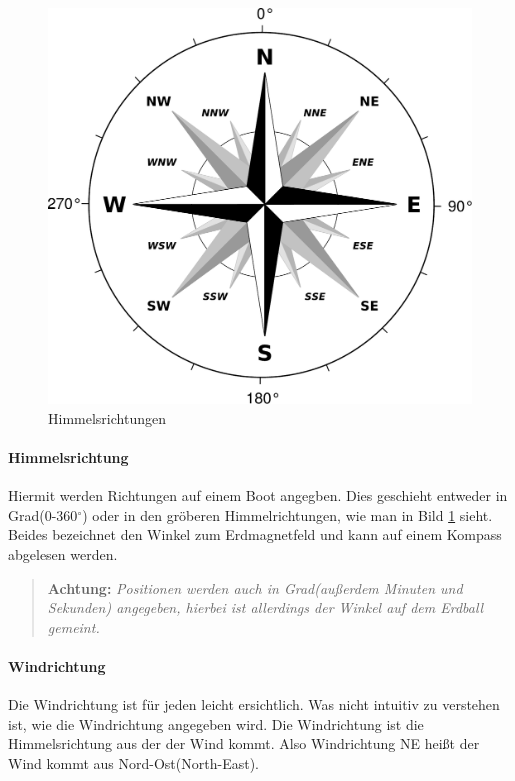 \documentclass[12pt]{article}
\begin{document}
\begin{figure}[H]
\begin{center}
\includegraphics[scale=0.4]{bilder/windrose.pdf}
\caption{Himmelsrichtungen}
\label{himmelsrichtungen}
\end{center}
\end{figure}

\paragraph{Himmelsrichtung}
Hiermit werden Richtungen auf einem Boot angegben. Dies geschieht entweder in Grad(0-360$^\circ$) oder in den gröberen Himmelrichtungen, wie man in Bild \ref{himmelsrichtungen} sieht. Beides bezeichnet den Winkel zum Erdmagnetfeld und kann auf einem Kompass abgelesen werden.

\begin{quote}
\textbf{Achtung:} \textit{Positionen werden auch in Grad(außerdem Minuten und Sekunden) angegeben, hierbei ist allerdings der Winkel auf dem Erdball gemeint.}
\end{quote}

\paragraph{Windrichtung}
Die Windrichtung ist für jeden leicht ersichtlich. Was nicht intuitiv zu verstehen ist, wie die Windrichtung angegeben wird. Die Windrichtung ist die Himmelsrichtung aus der der Wind kommt. Also Windrichtung NE heißt der Wind kommt aus Nord-Ost(North-East).
\end{document}
